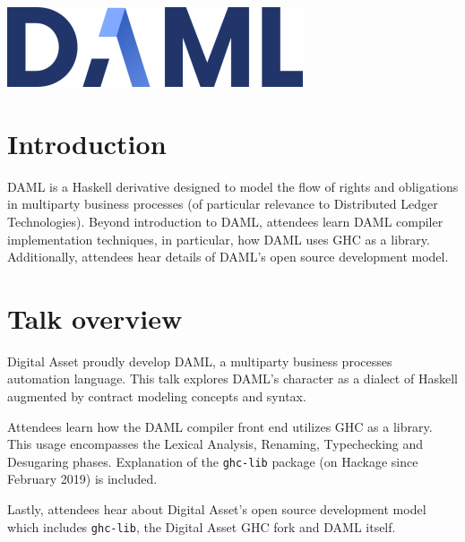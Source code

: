 \documentclass[acmsmall]{acmart}
\begin{document}
%
\begin{teaserfigure}
\includegraphics{img/DAML_330x89}
\label{fig:teaser}
\end{teaserfigure}

%
\maketitle

\section{Introduction}
DAML is a Haskell derivative designed to model the flow of rights and obligations in multiparty business processes (of particular relevance to Distributed Ledger Technologies). Beyond introduction to DAML, attendees learn DAML compiler implementation techniques, in particular, how DAML uses GHC as a library. Additionally, attendees hear details of DAML's open source development model.

\section{Talk overview}
Digital Asset proudly develop DAML, a multiparty business processes automation language. This talk explores DAML's character as a dialect of Haskell augmented by contract modeling concepts and syntax.

Attendees learn how the DAML compiler front end utilizes GHC as a library. This usage encompasses the Lexical Analysis, Renaming, Typechecking and Desugaring phases. Explanation of the \verb|ghc-lib| package (on Hackage since February 2019) is included.

Lastly, attendees hear about Digital Asset's open source development model which includes \verb|ghc-lib|, the Digital Asset GHC fork and DAML itself.
\end{document}
